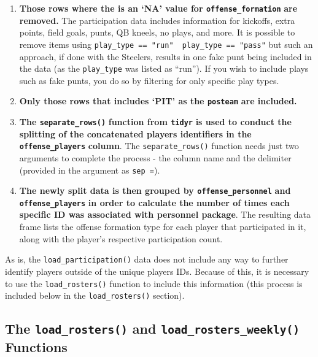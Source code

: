 \documentclass[
  letterpaper,
]{krantz}
\providecommand{\tightlist}{%
  \setlength{\itemsep}{0pt}\setlength{\parskip}{0pt}}\usepackage{longtable,booktabs,array}
\begin{document}
\begin{enumerate}
\def\labelenumi{\arabic{enumi}.}
\tightlist
\item
  \textbf{Those rows where the is an `NA' value for
  \texttt{offense\_formation}} \textbf{are removed.} The participation
  data includes information for kickoffs, extra points, field goals,
  punts, QB kneels, no plays, and more. It is possible to remove items
  using
  \texttt{play\_type\ ==\ "run"\ \textbar{}\ play\_type\ ==\ "pass"} but
  such an approach, if done with the Steelers, results in one fake punt
  being included in the data (as the \texttt{play\_type} was listed as
  ``run''). If you wish to include plays such as fake punts, you do so
  by filtering for only specific play types.
\item
  \textbf{Only those rows that includes `PIT' as the \texttt{posteam}}
  \textbf{are included.}
\item
  \textbf{The \texttt{separate\_rows()}} \textbf{function from
  \texttt{tidyr}} \textbf{is used to conduct the splitting of the
  concatenated players identifiers in the \texttt{offense\_players}}
  \textbf{column}. The \texttt{separate\_rows()} function needs just two
  arguments to complete the process - the column name and the delimiter
  (provided in the argument as \texttt{sep\ =}).
\item
  \textbf{The newly split data is then grouped by
  \texttt{offense\_personnel}} \textbf{and \texttt{offense\_players}}
  \textbf{in order to calculate the number of times each specific ID was
  associated with personnel package}. The resulting data frame lists the
  offense formation type for each player that participated in it, along
  with the player's respective participation count.
\end{enumerate}

As is, the \texttt{load\_participation()} data does not include any way
to further identify players outside of the unique players IDs. Because
of this, it is necessary to use the \texttt{load\_rosters()} function to
include this information (this process is included below in the
\texttt{load\_rosters()} section).

\hypertarget{the-load_rosters-and-load_rosters_weekly-functions}{%
\subsection{\texorpdfstring{The \texttt{load\_rosters()} and
\texttt{load\_rosters\_weekly()}
Functions}{The load\_rosters() and load\_rosters\_weekly() Functions}}\label{the-load_rosters-and-load_rosters_weekly-functions}}
\end{document}
